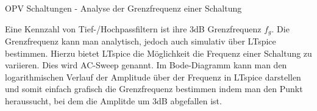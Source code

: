        \begin{frame}[t]{OPV Schaltungen - Analyse der Grenzfrequenz einer Schaltung }

        \begin{spacing}{0.6} \begin{tiny}
        Eine Kennzahl von Tief-/Hochpassfiltern ist ihre 3dB Grenzfrequenz $f_g$. Die Grenzfrequenz kann man analytisch, jedoch auch simulativ
        über LTspice bestimmen. Hierzu bietet LTspice die Möglichkeit die Frequenz einer Schaltung zu variieren. Dies wird AC-Sweep genannt. 
        Im Bode-Diagramm kann man den logarithmischen Verlauf der Amplitude über der Frequenz in LTspice darstellen und 
        somit einfach grafisch die Grenzfrequenz bestimmen indem man den Punkt heraussucht, bei dem die Amplitde um 3dB abgefallen ist.
        \end{tiny} \end{spacing}
  

\end{frame}
